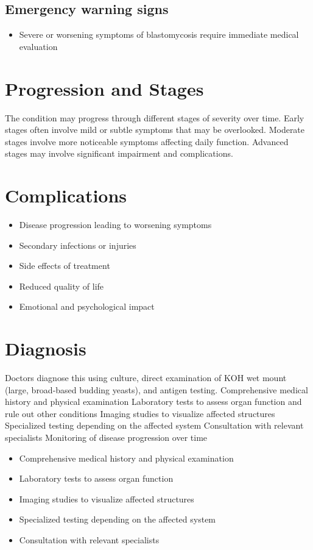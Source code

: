 \subsection{Emergency warning signs}
\begin{itemize}[noitemsep]
  \item Severe or worsening symptoms of blastomycosis require immediate medical evaluation
\end{itemize}
\section{Progression and Stages}
The condition may progress through different stages of severity over time. Early stages often involve mild or subtle symptoms that may be overlooked. Moderate stages involve more noticeable symptoms affecting daily function. Advanced stages may involve significant impairment and complications.
\section{Complications}
\begin{itemize}[noitemsep]
  \item Disease progression leading to worsening symptoms
  \item Secondary infections or injuries
  \item Side effects of treatment
  \item Reduced quality of life
  \item Emotional and psychological impact
\end{itemize}
\section{Diagnosis}
Doctors diagnose this using culture, direct examination of KOH wet mount (large, broad-based budding yeasts), and antigen testing. Comprehensive medical history and physical examination Laboratory tests to assess organ function and rule out other conditions Imaging studies to visualize affected structures Specialized testing depending on the affected system Consultation with relevant specialists Monitoring of disease progression over time

\begin{itemize}[noitemsep]
  \item Comprehensive medical history and physical examination
  \item Laboratory tests to assess organ function
  \item Imaging studies to visualize affected structures
  \item Specialized testing depending on the affected system
  \item Consultation with relevant specialists
\end{itemize}
